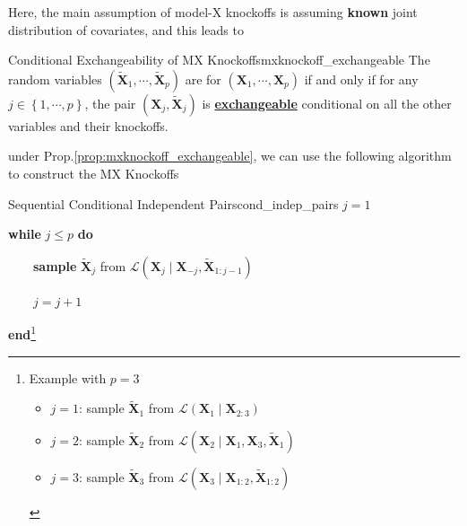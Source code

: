 \documentclass[twoside]{article}
\begin{document}
Here, the main assumption of model-X knockoffs is assuming \textbf{known} joint distribution of covariates, and this leads to 
\begin{proposition}{Conditional Exchangeability of MX Knockoffs}{mxknockoff_exchangeable}
    The random variables $ (\tilde{\mathbf{X}}_1,\cdots,\tilde{\mathbf{X}}_p) $ are  for $({\mathbf{X}}_1,\cdots,{\mathbf{X}}_p)$ if and only if for any $j\in \left\{1,\cdots,p\right\}$, the pair $({\mathbf{X}}_j,\tilde{\mathbf{X}}_j)$ is \textbf{\underline{exchangeable}} conditional on all the other variables and their knockoffs.
\end{proposition}
under Prop.\ref{prop:mxknockoff_exchangeable}, we can use the following algorithm to construct the MX Knockoffs 
\begin{algorithm}{Sequential Conditional Independent Pairs}{cond_indep_pairs}
    $j=1$ 
                        
    \textbf{while} $j\leq p$ \textbf{do}

    \ \ \ \ \textbf{sample} $\tilde{\mathbf{X}}_j$ from $\mathcal{L}(\mathbf{X}_j\mid \mathbf{X}_{-j},\tilde{\mathbf{X}}_{1:j-1})$

    \ \ \ \  $j=j+1$

    \textbf{end}\footnote{Example with $p=3$\begin{itemize} \item $j=1$: sample $\tilde{\mathbf{X}}_1$ from $\mathcal{L}(\mathbf{X}_1 \mid \mathbf{X}_{2:3})$
        \item $j=2$: sample $\tilde{\mathbf{X}}_2$ from $\mathcal{L}(\mathbf{X}_2\mid \mathbf{X}_1,\mathbf{X}_3,\tilde{\mathbf{X}}_1)$ 
        \item $j=3$: sample $\tilde{\mathbf{X}}_3$ from $\mathcal{L}(\mathbf{X}_3\mid \mathbf{X}_{1:2},\tilde{\mathbf{X}}_{1:2})$ \end{itemize} }
\end{algorithm}
\end{document}
